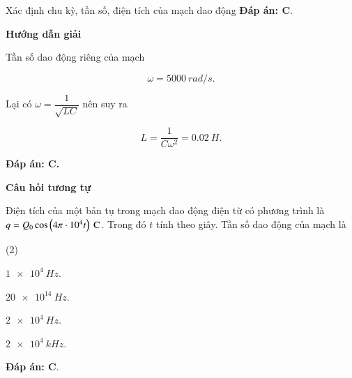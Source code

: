 \begin{dang}{Xác định chu kỳ, tần số, điện tích của mạch dao động}
{		\textbf{Đáp án: C}.
	}
	
	{	\begin{center}
			\textbf{Hướng dẫn giải}
		\end{center}
		
		Tần số dao động riêng của mạch 
		
		$$\omega = \SI{5000}{rad/s}.$$ 
		
		Lại có $\omega = \dfrac{1}{\sqrt{LC}}$ nên suy ra
		
		$$L = \dfrac{1}{C \omega^2} = \SI{0,02}{H}.$$ 
		
		\textbf{Đáp án: C.}
		
		\begin{center}
			\textbf{Câu hỏi tương tự}
		\end{center}
		
		Điện tích của một bản tụ trong mạch dao động điện từ có phương trình là $q = Q_0 \cos \left( 4\pi \cdot 10^{4}t \right)\ \text C$. Trong đó $t$ tính theo giây. Tần số dao động của mạch là
		\begin{mcq}(2)
			\item $ \SI{1e4}{Hz} $.
			\item $ \SI{20e14}{Hz} $.
			\item $ \SI{2e4}{Hz} $.
			\item $ \SI{2e4}{kHz} $.
		\end{mcq}
		
		\textbf{Đáp án: C}.
	}
	
\end{dang}

